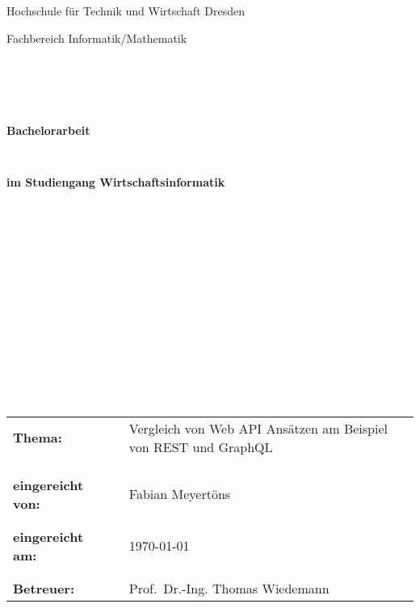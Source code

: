 \thispagestyle{empty}
\begin{center}
\Large{Hochschule für Technik und Wirtschaft Dresden}\\
\end{center}


\begin{center}
\Large{Fachbereich Informatik/Mathematik}
\end{center}
\begin{verbatim}





\end{verbatim}
\begin{center}
\textbf{\LARGE{Bachelorarbeit}}
\end{center}
\begin{verbatim}


\end{verbatim}
\begin{center}
\textbf{im Studiengang Wirtschaftsinformatik}
\end{center}
\begin{verbatim}
















\end{verbatim}

\begin{flushleft}
\begin{tabular}{lll}
\textbf{Thema:} & & Vergleich von Web API Ansätzen am Beispiel von REST und GraphQL\\
& & \\
& & \\
& & \\
\textbf{eingereicht von:} & & Fabian Meyertöns\\
& & \\
& & \\
\textbf{eingereicht am:} & & \today\\
& & \\
& & \\
\textbf{Betreuer:} & & Prof.\ Dr.-Ing. Thomas Wiedemann
\end{tabular}
\end{flushleft}